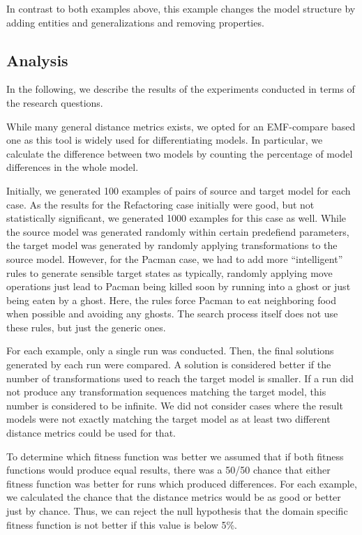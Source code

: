 In contrast to both examples above, this example changes the model structure by adding entities and generalizations and removing properties.



\subsection{Analysis}

In the following, we describe the results of the experiments conducted in terms of the research questions.


While many general distance metrics exists, we opted for an EMF-compare based one as this tool is widely used for differentiating models. In particular, we calculate the difference between two models by counting the percentage of model differences in the whole model.

Initially, we generated 100 examples of pairs of source and target model for each case. As the results for the Refactoring case initially were good, but not statistically significant, we generated 1000 examples for this case as well. While the source model was generated randomly within
certain predefiend parameters, the target model was generated by randomly applying transformations to the source model. 
However, for the Pacman case, we had to add more "`intelligent"' rules to generate sensible target states as typically, randomly applying move operations
just lead to Pacman being killed soon by running into a ghost or just being eaten by a ghost. Here, the rules force Pacman to eat neighboring food when possible and avoiding any ghosts. The search process itself does not use these rules, but just the generic ones.

For each example, only a single run was conducted. Then, the final solutions generated by each run were compared.
A solution is considered better if the number of transformations used to reach the target model is smaller. If a run did 
not produce any transformation sequences matching the target model, this number is considered to be infinite. We did not consider cases where 
the result models were not exactly matching the target model as at least two different distance metrics could be used for that.

To determine which fitness function was better we assumed that if both fitness functions would produce equal results,
there was a 50/50 chance that either fitness function was better for runs which produced differences.
For each example, we calculated the chance that the distance metrics would be as good or better just by chance.
Thus, we can reject the null hypothesis that the domain specific fitness function is not better if this value is below 5\%.


